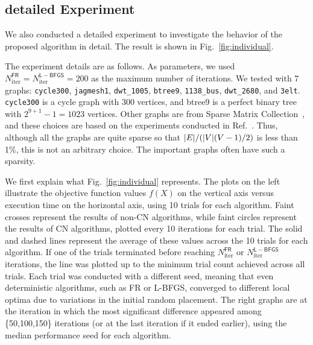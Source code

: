 \documentclass[dvipdfmx,10pt,journal,compsoc]{IEEEtran}
\begin{document}
\subsection{detailed Experiment}\label{ssec:exprDetail}

We also conducted a detailed experiment to investigate the behavior of the proposed algorithm in detail. The result is shown in Fig.~\ref{fig:individual}.

The experiment details are as follows.
As parameters, we used $N_\mathrm{iter}^\mathsf{FR} = N_\mathrm{iter}^\mathsf{L-BFGS} = 200$ as the maximum number of iterations.
We tested with 7 graphs: \texttt{cycle300}, \texttt{jagmesh1}, \texttt{dwt\_1005}, \texttt{btree9}, \texttt{1138\_bus}, \texttt{dwt\_2680}, and \texttt{3elt}. \texttt{cycle300} is a cycle graph with 300 vertices, and btree9 is a perfect binary tree with $2^{9+1}-1=1023$ vertices. Other graphs are from Sparse Matrix Collection~\cite{davis2011university}, and these choices are based on the experiments conducted in Ref.~\cite{8419285}. Thus, although all the graphs are quite sparse so that $\abs{E} / (\abs{V}(V-1)/2)$ is less than 1\%, this is not an arbitrary choice. The important graphs often have such a sparsity.

We first explain what Fig.~\ref{fig:individual} represents.
The plots on the left illustrate the objective function values $f(X)$ on the vertical axis versus execution time on the horizontal axis, using 10 trials for each algorithm.
Faint crosses represent the results of non-\textsf{CN} algorithms, while faint circles represent the results of \textsf{CN} algorithms, plotted every 10 iterations for each trial.
The solid and dashed lines represent the average of these values across the 10 trials for each algorithm.
If one of the trials terminated before reaching $N_\mathrm{iter}^\mathsf{FR}$ or $N_\mathrm{iter}^\mathsf{L-BFGS}$ iterations, the line was plotted up to the minimum trial count achieved across all trials.
Each trial was conducted with a different seed, meaning that even deterministic algorithms, such as \textsf{FR} or \textsf{L-BFGS}, converged to different local optima due to variations in the initial random placement.
The right graphs are at the iteration in which the most significant difference appeared among \{50,100,150\} iterations (or at the last iteration if it ended earlier), using the median performance seed for each algorithm.
\end{document}
